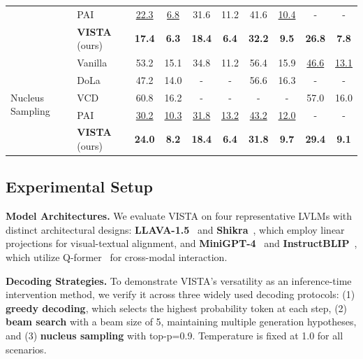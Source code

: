 \documentclass{article}
\newcommand{\ours}{{VISTA}\xspace}
\theoremstyle{plain}
\theoremstyle{definition}
\theoremstyle{remark}
\begin{document}
\begin{table}[t]
{\begin{tabular}{llcccccccc}
        & PAI~\cite{pai} & \underline{22.3} & \underline{6.8} & 31.6 & 11.2 & 41.6 & \underline{10.4} & - & - \\
        & \cellcolor{lightgray}\textbf{\ours} (ours) & \cellcolor{lightgray}\bf 17.4 & \cellcolor{lightgray}\bf 6.3 & \cellcolor{lightgray}\bf 18.4 & \cellcolor{lightgray}\bf 6.4 & \cellcolor{lightgray}\bf 32.2 & \cellcolor{lightgray}\bf 9.5 & \cellcolor{lightgray}\bf 26.8 & \cellcolor{lightgray}\bf 7.8 \\
        \midrule
        \multirow{5}{*}{Nucleus Sampling} 
        & Vanilla & 53.2 & 15.1 & 34.8 & 11.2 & 56.4 & 15.9 & \underline{46.6} & \underline{13.1} \\
        & DoLa ~\cite{dola} & 47.2 & 14.0 & - & - & 56.6 & 16.3 & - & - \\
        & VCD~\cite{vcd} & 60.8 & 16.2 & - & - & - & - & 57.0 & 16.0 \\
        & PAI~\cite{pai} & \underline{30.2} & \underline{10.3} & \underline{31.8} & \underline{13.2} & \underline{43.2} & \underline{12.0} & - & - \\
        & \cellcolor{lightgray}\textbf{\ours} (ours) & \cellcolor{lightgray}\bf 24.0 & \cellcolor{lightgray}\bf 8.2 & \cellcolor{lightgray}\bf 18.4 & \cellcolor{lightgray}\bf 6.4 & \cellcolor{lightgray}\bf 31.8 & \cellcolor{lightgray}\bf 9.7 & \cellcolor{lightgray}\bf 29.4 & \cellcolor{lightgray}\bf 9.1 \\
        \bottomrule
    \end{tabular}
    }
    \label{tab:chair}
    \vspace{-10pt}
\end{table}

\subsection{Experimental Setup}
\label{sec:experiment-setup}
\textbf{Model Architectures.} We evaluate VISTA on four representative LVLMs with distinct architectural designs: \textbf{LLAVA-1.5}~\cite{llava15} and \textbf{Shikra}~\cite{shikra}, which employ linear projections for visual-textual alignment, and \textbf{MiniGPT-4}~\cite{minigpt4} and \textbf{InstructBLIP}~\cite{instructblip}, which utilize Q-former~\cite{li2023blip} for cross-modal interaction.

\textbf{Decoding Strategies.} To demonstrate VISTA's versatility as an inference-time intervention method, we verify it across three widely used decoding protocols: (1) \textbf{greedy decoding}, which selects the highest probability token at each step, (2) \textbf{beam search} with a beam size of 5, maintaining multiple generation hypotheses, and (3) \textbf{nucleus sampling} with top-p=0.9. Temperature is fixed at 1.0 for all scenarios.
\end{document}
